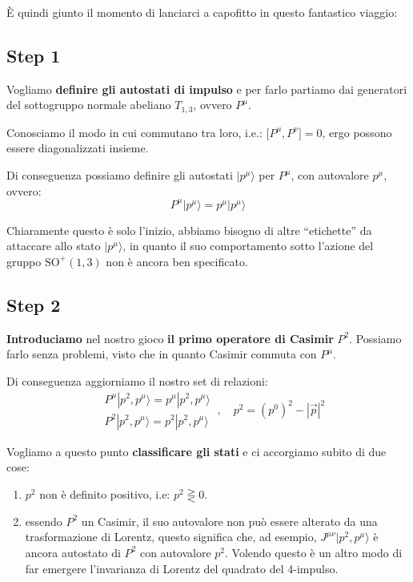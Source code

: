 \documentclass[../main.tex]{subfiles}
\begin{document}
È quindi giunto il momento di lanciarci a capofitto in questo fantastico viaggio:
\subsection{Step 1}
Vogliamo \textbf{definire gli autostati di impulso} e per farlo partiamo dai generatori del sottogruppo normale abeliano $T_{1,3}$, ovvero $P^\mu$.

Conosciamo il modo in cui commutano tra loro, i.e.: \(\big[P^\mu, P^\nu\big] =0\), ergo possono essere diagonalizzati insieme.

Di conseguenza possiamo definire gli autostati \(|p^\mu\rangle\) per $P^\mu$, con autovalore $p^\mu$, ovvero:
\[
\boxed{
P^\mu|p^\mu\rangle = p^\mu|p^\mu\rangle
}
\]

Chiaramente questo è solo l'inizio, abbiamo bisogno di altre “etichette” da attaccare allo stato $|p^\mu\rangle$, in quanto il suo comportamento sotto l'azione del gruppo \(\text{SO}^+(1,3)\) non è ancora ben specificato.

\subsection{Step 2}
\textbf{Introduciamo} nel nostro gioco \textbf{il primo operatore di Casimir} $P^2$. Possiamo farlo senza problemi, visto che in quanto Casimir commuta con $P^\mu$.

Di conseguenza aggiorniamo il nostro set di relazioni:
\[
\boxed{
    \begin{aligned}
        &P^\mu|p^2, p^\mu\rangle = p^\mu|p^2, p^\mu\rangle\\
        &P^2|p^2, p^\mu\rangle = p^2|p^2, p^\mu\rangle
    \end{aligned}
}~, \quad p^2 = (p^0)^2 - |\Vec{p}|^2
\]

Vogliamo a questo punto \textbf{classificare gli stati} e ci accorgiamo subito di due cose:
\begin{enumerate}
    \item $p^2$ non è definito positivo, i.e: \(p^2\gtreqless 0\).
    \item essendo $P^2$ un Casimir, il suo autovalore non può essere alterato da una trasformazione di Lorentz, questo significa che, ad esempio, \(J^{\mu\nu}|p^2, p^\mu\rangle\) è ancora autostato di $P^2$ con autovalore $p^2$. Volendo questo è un altro modo di far emergere l'invarianza di Lorentz del quadrato del 4-impulso.
\end{enumerate}
\end{document}
